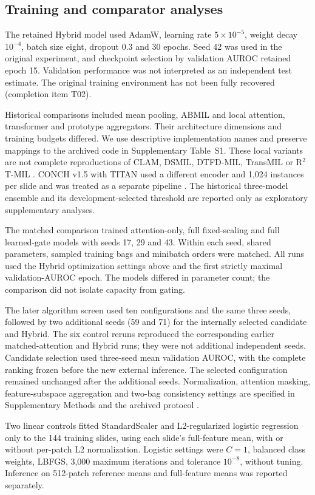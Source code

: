 \subsection{Training and comparator analyses}
The retained Hybrid model used AdamW, learning rate $5\times10^{-5}$, weight decay $10^{-4}$, batch size eight, dropout 0.3 and 30 epochs. Seed 42 was used in the original experiment, and checkpoint selection by validation AUROC retained epoch 15. Validation performance was not interpreted as an independent test estimate. The original training environment has not been fully recovered (completion item T02).

Historical comparisons included mean pooling, ABMIL and local attention, transformer and prototype aggregators. Their architecture dimensions and training budgets differed. We use descriptive implementation names and preserve mappings to the archived code in Supplementary Table~S1. These local variants are not complete reproductions of CLAM, DSMIL, DTFD-MIL, TransMIL or R$^2$T-MIL \citep{ref7,ref14,ref15,ref16,rrt2024}. CONCH v1.5 with TITAN used a different encoder and 1,024 instances per slide and was treated as a separate pipeline \citep{ref13}. The historical three-model ensemble and its development-selected threshold are reported only as exploratory supplementary analyses.

The matched comparison trained attention-only, full fixed-scaling and full learned-gate models with seeds 17, 29 and 43. Within each seed, shared parameters, sampled training bags and minibatch orders were matched. All runs used the Hybrid optimization settings above and the first strictly maximal validation-AUROC epoch. The models differed in parameter count; the comparison did not isolate capacity from gating.

The later algorithm screen used ten configurations and the same three seeds, followed by two additional seeds (59 and 71) for the internally selected candidate and Hybrid. The six control reruns reproduced the corresponding earlier matched-attention and Hybrid runs; they were not additional independent seeds. Candidate selection used three-seed mean validation AUROC, with the complete ranking frozen before the new external inference. The selected configuration remained unchanged after the additional seeds. Normalization, attention masking, feature-subspace aggregation and two-bag consistency settings are specified in Supplementary Methods and the archived protocol \citep{acmil2024,nnmil2026,rdrop2021}.

Two linear controls fitted StandardScaler and L2-regularized logistic regression only to the 144 training slides, using each slide's full-feature mean, with or without per-patch L2 normalization. Logistic settings were $C=1$, balanced class weights, LBFGS, 3,000 maximum iterations and tolerance $10^{-8}$, without tuning. Inference on 512-patch reference means and full-feature means was reported separately.

